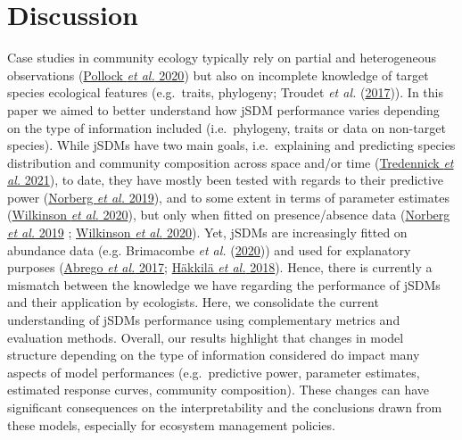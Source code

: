 \documentclass[9pt,biorxiv,doublespacing,lineno]{lapreprint}
\begin{document}
\hypertarget{discussion}{%
\section{Discussion}\label{discussion}}

Case studies in community ecology typically rely on partial and
heterogeneous observations (\protect\hyperlink{ref-Pollock_2020}{Pollock
\emph{et al.} 2020}) but also on incomplete knowledge of target species
ecological features (e.g.~traits, phylogeny; Troudet \emph{et al.}
(\protect\hyperlink{ref-Troudet_2017}{2017})). In this paper we aimed to
better understand how jSDM performance varies depending on the type of
information included (i.e.~phylogeny, traits or data on non-target
species). While jSDMs have two main goals, i.e.~explaining and
predicting species distribution and community composition across space
and/or time (\protect\hyperlink{ref-Tredennick_2021}{Tredennick \emph{et
al.} 2021}), to date, they have mostly been tested with regards to their
predictive power (\protect\hyperlink{ref-Norberg_2019}{Norberg \emph{et
al.} 2019}), and to some extent in terms of parameter estimates
(\protect\hyperlink{ref-Wilkinson_2020}{Wilkinson \emph{et al.} 2020}),
but only when fitted on presence/absence data
(\protect\hyperlink{ref-Norberg_2019}{Norberg \emph{et al.} 2019} ;
\protect\hyperlink{ref-Wilkinson_2020}{Wilkinson \emph{et al.} 2020}).
Yet, jSDMs are increasingly fitted on abundance data (e.g. Brimacombe
\emph{et al.} (\protect\hyperlink{ref-Brimacombe_2020}{2020})) and used
for explanatory purposes (\protect\hyperlink{ref-Abrego_2016}{Abrego
\emph{et al.} 2017}; \protect\hyperlink{ref-Hakkila_2018}{Häkkilä
\emph{et al.} 2018}). Hence, there is currently a mismatch between the
knowledge we have regarding the performance of jSDMs and their
application by ecologists. Here, we consolidate the current
understanding of jSDMs performance using complementary metrics and
evaluation methods. Overall, our results highlight that changes in model
structure depending on the type of information considered do impact many
aspects of model performances (e.g.~predictive power, parameter
estimates, estimated response curves, community composition). These
changes can have significant consequences on the interpretability and
the conclusions drawn from these models, especially for ecosystem
management policies.
\end{document}
